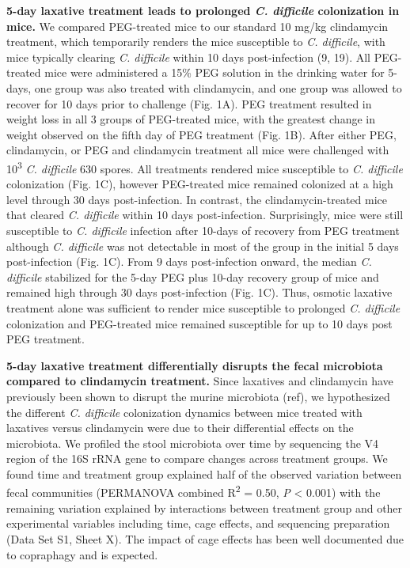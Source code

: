 \documentclass[
  11pt,
]{article}
\begin{document}
\textbf{5-day laxative treatment leads to prolonged \emph{C. difficile}
colonization in mice.} We compared PEG-treated mice to our standard 10
mg/kg clindamycin treatment, which temporarily renders the mice
susceptible to \emph{C. difficile}, with mice typically clearing
\emph{C. difficile} within 10 days post-infection (9, 19). All
PEG-treated mice were administered a 15\% PEG solution in the drinking
water for 5-days, one group was also treated with clindamycin, and one
group was allowed to recover for 10 days prior to challenge (Fig. 1A).
PEG treatment resulted in weight loss in all 3 groups of PEG-treated
mice, with the greatest change in weight observed on the fifth day of
PEG treatment (Fig. 1B). After either PEG, clindamycin, or PEG and
clindamycin treatment all mice were challenged with
10\textsuperscript{3} \emph{C. difficile} 630 spores. All treatments
rendered mice susceptible to \emph{C. difficile} colonization (Fig. 1C),
however PEG-treated mice remained colonized at a high level through 30
days post-infection. In contrast, the clindamycin-treated mice that
cleared \emph{C. difficile} within 10 days post-infection. Surprisingly,
mice were still susceptible to \emph{C. difficile} infection after
10-days of recovery from PEG treatment although \emph{C. difficile} was
not detectable in most of the group in the initial 5 days post-infection
(Fig. 1C). From 9 days post-infection onward, the median \emph{C.
difficile} stabilized for the 5-day PEG plus 10-day recovery group of
mice and remained high through 30 days post-infection (Fig. 1C). Thus,
osmotic laxative treatment alone was sufficient to render mice
susceptible to prolonged \emph{C. difficile} colonization and
PEG-treated mice remained susceptible for up to 10 days post PEG
treatment.

\textbf{5-day laxative treatment differentially disrupts the fecal
microbiota compared to clindamycin treatment.} Since laxatives and
clindamycin have previously been shown to disrupt the murine microbiota
(ref), we hypothesized the different \emph{C. difficile} colonization
dynamics between mice treated with laxatives versus clindamycin were due
to their differential effects on the microbiota. We profiled the stool
microbiota over time by sequencing the V4 region of the 16S rRNA gene to
compare changes across treatment groups. We found time and treatment
group explained half of the observed variation between fecal communities
(PERMANOVA combined R\textsuperscript{2} = 0.50, \emph{P} \textless{}
0.001) with the remaining variation explained by interactions between
treatment group and other experimental variables including time, cage
effects, and sequencing preparation (Data Set S1, Sheet X). The impact
of cage effects has been well documented due to copraphagy and is
expected.
\end{document}
